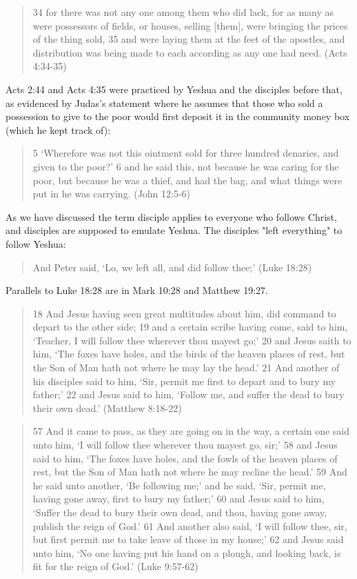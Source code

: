 \documentclass[11pt]{article}
\begin{document}
\begin{quote}
34 for there was not any one among them who did lack, for as many as were possessors of fields, or houses, selling [them], were bringing the prices of the thing sold,
35 and were laying them at the feet of the apostles, and distribution was being made to each according as any one had need. (Acts 4:34-35)
\end{quote}
Acts 2:44 and Acts 4:35 were practiced by Yeshua and the disciples before that, as evidenced by Judas's statement where he assumes that those who sold a possession to give to the poor would first deposit it in the community money box (which he kept track of):
\begin{quote}
5 `Wherefore was not this ointment sold for three hundred denaries, and given to the poor?' 6 and he said this, not because he was caring for the poor, but because he was a thief, and had the bag, and what things were put in he was carrying. (John 12:5-6)
\end{quote}
As we have discussed the term disciple applies to everyone who follows Christ, and disciples are supposed to emulate Yeshua. The disciples "left everything" to follow Yeshua: 
\begin{quote}
And Peter said, `Lo, we left all, and did follow thee;'
(Luke 18:28)
\end{quote}
Parallels to Luke 18:28 are in Mark 10:28 and Matthew 19:27.
\begin{quote}
18 And Jesus having seen great multitudes about him, did command to depart to the other side;
19 and a certain scribe having come, said to him, `Teacher, I will follow thee wherever thou mayest go;'
20 and Jesus saith to him, `The foxes have holes, and the birds of the heaven places of rest, but the Son of Man hath not where he may lay the head.'
21 And another of his disciples said to him, `Sir, permit me first to depart and to bury my father;'
22 and Jesus said to him, `Follow me, and suffer the dead to bury their own dead.' (Matthew 8:18-22)\end{quote}
\begin{quote}
57 And it came to pass, as they are going on in the way, a certain one said unto him, `I will follow thee wherever thou mayest go, sir;'
58 and Jesus said to him, `The foxes have holes, and the fowls of the heaven places of rest, but the Son of Man hath not where he may recline the head.'
59 And he said unto another, `Be following me;' and he said, `Sir, permit me, having gone away, first to bury my father;'
60 and Jesus said to him, `Suffer the dead to bury their own dead, and thou, having gone away, publish the reign of God.'
61 And another also said, `I will follow thee, sir, but first permit me to take leave of those in my house;'
62 and Jesus said unto him, `No one having put his hand on a plough, and looking back, is fit for the reign of God.' (Luke 9:57-62)\end{quote}
\end{document}
